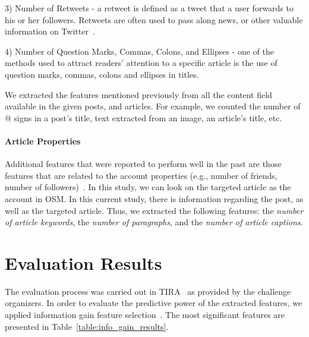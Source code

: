 \documentclass{sig-alternate}
\begin{document}
3) Number of Retweets - a retweet is defined as a tweet that a user forwards to his or her followers. 
Retweets are often used to pass along news, or other valuable information on Twitter~\cite{twitter_glossary}.  

4) Number of Question Marks, Commas, Colons, and Ellipses - one of the methods used to attract readers' attention to a specific article is the use of question marks, commas, colons and ellipses in titles.

We extracted the features mentioned previously from all the content field available in the given posts, and articles.
For example, we counted the number of @ signs in a post's title, text extracted from an image, an article's title, etc. 

\paragraph{Article Properties}
\label{sec:article_properties}

Additional features that were reported to perform well in the past are those features that are related to the account properties (e.g., number of friends, number of followers)~\cite{lee2013crowdturfers}.
In this study, we can look on the targeted article as the account in OSM.
In this current study, there is information regarding the post, as well as the targeted article.
Thus, we extracted the following features: the \emph{number of article keywords}, the \emph{number of paragraphs}, and the \emph{number of article captions}. 

\section{Evaluation Results}
\label{sec:evaluation_results}

The evaluation process was carried out in TIRA~\cite{potthast:2014} as provided by the challenge organizers. 
In order to evaluate the predictive power of the extracted features, we applied information gain feature selection~\cite{stachniss2005information}. 
The most significant features are presented in Table~\ref{table:info_gain_results}.
\end{document}
